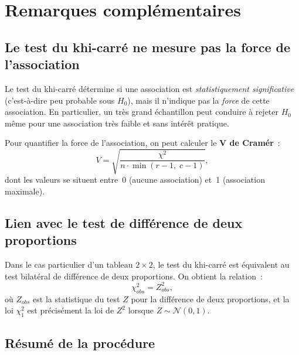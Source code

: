 \documentclass[11pt,french]{article}
\begin{document}
\section{Remarques complémentaires}

\subsection{Le test du khi-carré ne mesure pas la force de l'association}

Le test du khi-carré détermine si une association est \emph{statistiquement significative}
(c'est-à-dire peu probable sous $H_0$), mais il n'indique pas la \emph{force} de cette
association. En particulier, un très grand échantillon peut conduire à rejeter $H_0$ même
pour une association très faible et sans intérêt pratique.

Pour quantifier la force de l'association, on peut calculer le \textbf{V de Cramér}~:
\[
  V = \sqrt{\frac{\chi^2}{n \cdot \min(r-1,\; c-1)}},
\]
dont les valeurs se situent entre~0 (aucune association) et~1 (association maximale).

\subsection{Lien avec le test de différence de deux proportions}

Dans le cas particulier d'un tableau $2 \times 2$, le test du khi-carré est équivalent au
test bilatéral de différence de deux proportions. On obtient la relation~:
\[
  \chi^2_{obs} = Z_{obs}^2,
\]
où $Z_{obs}$ est la statistique du test $Z$ pour la différence de deux proportions, et la loi
$\chi^2_1$ est précisément la loi de $Z^2$ lorsque $Z \sim \mathcal{N}(0,1)$.

\subsection{Résumé de la procédure}
\end{document}
